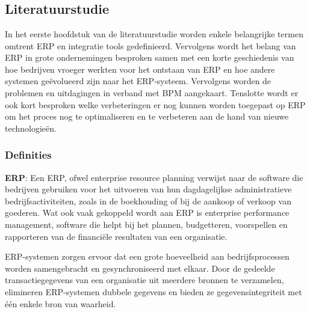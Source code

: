 \chapter{}%
\label{ch:stand-van-zaken}



\section{Literatuurstudie}%
\label{sec:literatuurstudieBP}

In het eerste hoofdstuk van de literatuurstudie worden enkele belangrijke termen omtrent ERP en integratie tools gedefinieerd. Vervolgens wordt het belang van ERP in grote ondernemingen besproken samen met een korte geschiedenis van hoe bedrijven vroeger werkten voor het ontstaan van ERP en hoe andere systemen geëvolueerd zijn naar het ERP-systeem. Vervolgens worden de problemen en uitdagingen in verband met BPM aangekaart. Tenslotte wordt er ook kort besproken welke verbeteringen er nog kunnen worden toegepast op ERP om het proces nog te optimaliseren en te verbeteren aan de hand van nieuwe technologieën.

\subsection{Definities}
\label{sec:DefinitiesBP}

\textbf{ERP}: Een ERP, ofwel enterprise resource planning verwijst naar de software die bedrijven gebruiken voor het uitvoeren van hun dagdagelijkse administratieve bedrijfsactiviteiten, zoals in de boekhouding of bij de aankoop of verkoop van goederen. Wat ook vaak gekoppeld wordt aan ERP is enterprise performance management, software die helpt bij het plannen, budgetteren, voorspellen en rapporteren van de financiële resultaten van een organisatie. \autocite{Oracle2017}

\vspace{\baselineskip}

ERP-systemen zorgen ervoor dat een grote hoeveelheid aan bedrijfsprocessen worden samengebracht en gesynchroniseerd met elkaar. Door de gedeelde transactiegegevens van een organisatie uit meerdere bronnen te verzamelen, elimineren ERP-systemen dubbele gegevens en bieden ze gegevensintegriteit met één enkele bron van waarheid. \autocite{Oracle2017}


